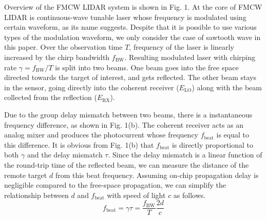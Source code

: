 \documentclass{article}
\begin{document}
Overview of the FMCW LIDAR system is shown in Fig. 1. At the core of FMCW LIDAR is continuous-wave tunable laser whose frequency is modulated using certain waveform, as its name suggests. Despite that it is possible to use various types of the modulation waveform, we only consider the case of sawtooth wave in this paper. Over the observation time $T$, frequency of the laser is linearly increased by the chirp bandwidth $f_\text{BW}$. Resulting modulated laser with chirping rate $\gamma=f_\text{BW}/T$ is split into two beams. One beam goes into the free space directed towards the target of interest, and gets reflected. The other beam stays in the sensor, going directly into the coherent receiver ($E_\text{LO}$) along with the beam collected from the reflection ($E_\text{RX}$). 

Due to the group delay mismatch between two beams, there is a instantaneous frequency difference, as shown in Fig. 1(b). The coherent receiver acts as an analog mixer and produces the photocurrent whose frequency $f_\text{beat}$ is equal to this difference. It is obvious from Fig. 1(b) that $f_\text{beat}$ is directly proportional to both $\gamma$ and the delay mismatch $\tau$. Since the delay mismatch is a linear function of the round-trip time of the reflected beam, we can measure the distance of the remote target $d$ from this beat frequency. Assuming on-chip propagation delay is negligible compared to the free-space propagation, we can simplify the relationship between $d$ and $f_\text{beat}$ with speed of light $c$ as follows.
\begin{equation}
f_\text{beat} = \gamma\tau = \frac{f_\text{BW}}{T}\frac{2d}{c}
\end{equation}
\end{document}
